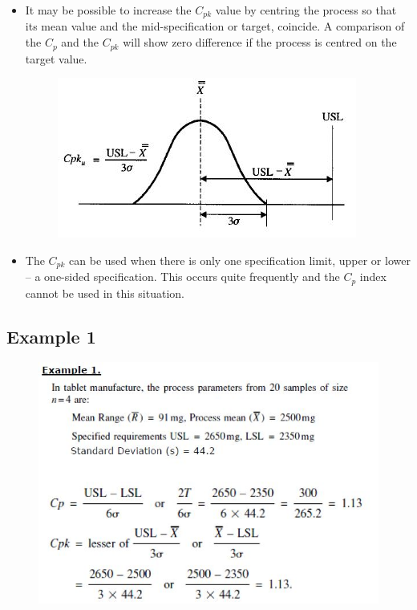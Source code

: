 \documentclass[MASTER-SPC.tex]{subfiles}
\begin{document}
\begin{itemize}
\item	It may be possible to increase the $C_{pk}$ value by centring the process so that its mean value and the mid-specification or target, coincide. A comparison of the $C_p$ and the $C_{pk}$ will show zero difference if the process is centred on the target value.
	
	\begin{figure}[h!]
		\centering
		\includegraphics[width=0.7\linewidth]{proccapindices/image5}
	\end{figure}
	
\item	The $C_{pk}$ can be used when there is only one specification limit, upper or lower – a one-sided specification. This occurs quite frequently and the $C_p$ index cannot be used in this situation.
\end{itemize}
\newpage

					\subsection*{Example 1}
					
					\begin{figure}[h!]
						\centering
						\includegraphics[width=1\linewidth]{proccapindices/Example1}
					\end{figure}
					
\end{document}
